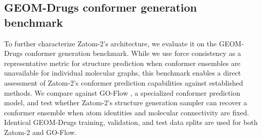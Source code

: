 \documentclass{article} %
\begin{document}
\begin{table}[htbp]
  \centering
  \scriptsize
  \caption{\textbf{Individual PoseBusters checks for GEOM-Drugs generation.}
  Published baseline values are reported from Table~3 of
  \citet{morehead2026zatom1} (arXiv v4). Results are percentages among RDKit-valid molecules.}
  \label{tab:geom-drugs-posebusters-baselines}
  \vspace{0.4em}
\end{table}
\FloatBarrier

\subsection{GEOM-Drugs conformer generation benchmark}
  \label{app:geom-drugs-conformer-benchmark}

To further characterize Zatom-2's architecture, we evaluate it on the GEOM-Drugs conformer generation benchmark. While we use force consistency as a representative metric for structure prediction when conformer ensembles are unavailable for individual molecular graphs, this benchmark enables a direct assessment of Zatom-2's conformer prediction capabilities against established methods. We compare against GO-Flow \citep{liu2026goflow}, a specialized conformer prediction model, and test whether Zatom-2's structure generation sampler can recover a conformer ensemble when atom identities and molecular connectivity are fixed. Identical GEOM-Drugs training, validation, and test data splits are used for both Zatom-2 and GO-Flow.
\end{document}
